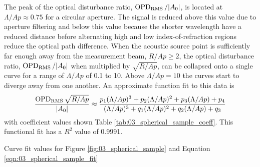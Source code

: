 The peak of the optical disturbance ratio, $\operatorname{OPD_{RMS}}/|A_0|$, is located at $\Lambda/Ap\approx0.75$ for a circular aperture.
The signal is reduced above this value due to aperture filtering and below this value because the shorter wavelength have a reduced distance before alternating high and low index-of-refraction regions reduce the optical path difference.
When the acoustic source point is sufficiently far enough away from the measurement beam, $R/Ap\geq2$, the optical disturbance ratio, $\operatorname{OPD_{RMS}}/|A_0|$ when multiplied by $\sqrt{R/Ap}$, can be collapsed onto a single curve for a range of $\Lambda/Ap$ of 0.1 to 10.
Above $\Lambda/Ap=10$ the curves start to diverge away from one another.
An approximate function fit to this data is
\begin{equation}
  \frac{\operatorname{OPD_{RMS}}\sqrt{R/Ap}}{|A_0|} \approx \frac{p_1(\Lambda/Ap)^3+p_2(\Lambda/Ap)^2+p_3(\Lambda/Ap)+p_4}{(\Lambda/Ap)^3+q_1(\Lambda/Ap)^2+q_2(\Lambda/Ap)+q_3}
  \label{eqn:03_spherical_sample_fit}
\end{equation}
with coefficient values shown Table \ref{tab:03_spherical_sample_coeff}.
This functional fit has a $R^2$ value of 0.9991.
\begin{table}
\centering
\caption{Curve fit values for Figure \ref{fig:03_spherical_sample} and Equation \ref{eqn:03_spherical_sample_fit}}

\label{tab:03_spherical_sample_coeff}
\end{table}


